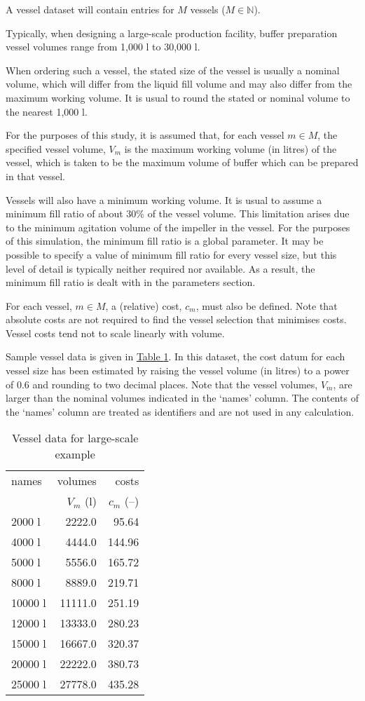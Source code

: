 A vessel dataset will contain entries for $M$ vessels ($M \in \mathbb{N}$).

Typically, when designing a large-scale production facility, buffer preparation
vessel volumes range from 1,000 l to 30,000 l.

When ordering such a vessel, the stated size of the vessel is usually a nominal
volume, which will differ from the liquid fill volume and may also differ from
the maximum working volume.
It is usual to round the stated or nominal volume to the nearest 1,000 l.

For the purposes of this study, it is assumed that, for each vessel $m \in M$,
the specified vessel volume, $V_{m}$ is the maximum working volume (in litres)
of the vessel, which is taken to be the maximum volume of buffer which can be
prepared in that vessel.

Vessels will also have a minimum working volume. 
It is usual to assume a minimum fill ratio of about 30\% of the vessel volume. 
This limitation arises due to the minimum agitation volume of the impeller in
the vessel. 
For the purposes of this simulation, the minimum fill ratio is a global
parameter.
It may be possible to specify a value of minimum fill ratio for every vessel
size, but this level of detail is typically neither required nor available.
As a result, the minimum fill ratio is dealt with in the parameters section.

For each vessel, $m \in M$, a (relative) cost, $c_{m}$, must also be defined.
Note that absolute costs are not required to find the vessel selection that
minimises costs.
Vessel costs tend not to scale linearly with volume.

Sample vessel data is given in \hyperref[tbl.vessel]{Table \ref*{tbl.vessel}}.
In this dataset, the cost datum for each vessel size has been estimated by
raising the vessel volume (in litres) to a power of 0.6 and rounding to two
decimal places.
Note that the vessel volumes, $V_{m}$, are larger than the nominal volumes
indicated in the `names' column.  The contents of the `names' column are
treated as identifiers and are not used in any calculation.
\begin{table}[h!]
    \centering
    \caption{Vessel data for large-scale example}
    \label{tbl.vessel}
    \begin{tabular}{l | r | r}
        names & volumes & costs\\
        & $V_{m}$ (l) & $c_{m}$ (--)\\\hline
        2000 l & 2222.0 & 95.64\\
        4000 l & 4444.0 & 144.96\\
        5000 l & 5556.0 & 165.72\\
        8000 l & 8889.0 & 219.71\\
        10000 l & 11111.0 & 251.19\\
        12000 l & 13333.0 & 280.23\\
        15000 l & 16667.0 & 320.37\\
        20000 l & 22222.0 & 380.73\\
        25000 l & 27778.0 & 435.28\\
    \end{tabular}
\end{table}

